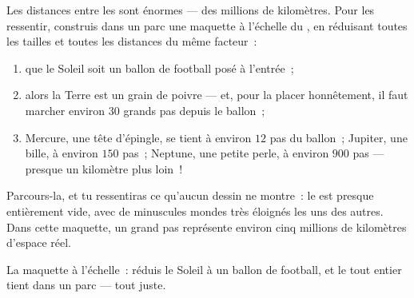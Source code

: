 \begin{method}\label{met:g4:solar-system:model}
Les distances entre les  sont énormes --- des millions de
kilomètres. Pour les ressentir, construis dans un parc une maquette à
l'échelle du , en réduisant toutes les tailles et
toutes les distances du même facteur~:
\begin{enumerate}
  \item que le Soleil soit un ballon de football posé à l'entrée~;
  \item alors la Terre est un grain de poivre --- et, pour la placer
        honnêtement, il faut marcher environ $30$ grands pas depuis
        le ballon~;
  \item Mercure, une tête d'épingle, se tient à environ $12$ pas du
        ballon~; Jupiter, une bille, à environ $150$ pas~; Neptune,
        une petite perle, à environ $900$ pas --- presque un
        kilomètre plus loin~!
\end{enumerate}
Parcours-la, et tu ressentiras ce qu'aucun dessin ne montre~: le
 est presque entièrement vide, avec de minuscules
mondes très éloignés les uns des autres. Dans cette maquette, un
grand pas représente environ cinq millions de kilomètres d'espace
réel.
\end{method}

\begin{omfigure}

{\small La maquette à l'échelle~: réduis le Soleil à un ballon de
football, et le  tout entier tient dans un parc ---
tout juste.}
\end{omfigure}

